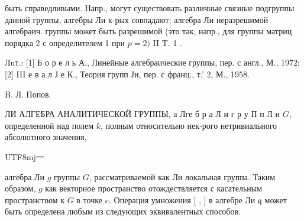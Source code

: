 \documentclass[10pt]{article}
\begin{document}
быть справедливыми. Напр., могут существовать различные связные подгруппы данной группы, алгебры Ли к-рых совпадают; алгебра Ли неразрешимой алгебраич. группы может быть разрешимой (это так, напр., для группы матриц порядка 2 с определителем 1 при $p=2)$ II T. 1 .



Лuт.: [1] Б о р е л ь А., Линейные алгебраические группы, пер. с англ., М., 1972; [2] III е в а л Ј е К., Теория групп Ји, пер. с франц., т.' 2, М., 1958.



B. Л. Попов.



ЛИ АЛГЕБРА АНАЛИТИЧЕСКОЙ ГРУППЫ, а Лге б р а Л и г р у П п Л и $G$, определенной над полем $k$, полным относительно нек-рого нетривиального абсолютного значения,\begin{CJK}{UTF8}{mj}一\end{CJK}алгебра Ли $g$ группы $G$, рассматриваемой как Ли локальная группа. Таким образом, $g$ как векторное пространство отождествляется с касательным пространством к $G$ в точке $e$. Операция умножения [ , ] в алгебре Ли $\mathfrak{q}$ может быть определена любым из следующих эквивалентных способов.
\end{document}
